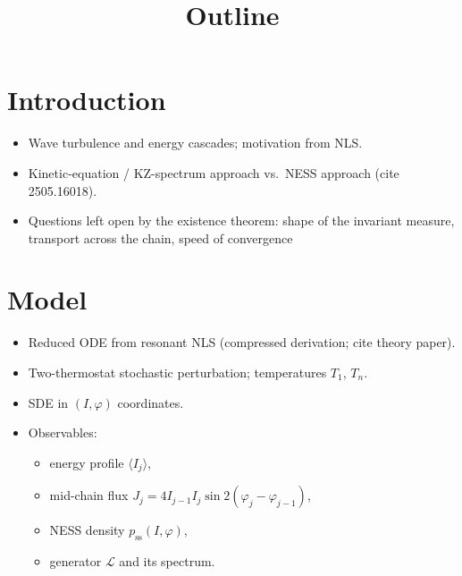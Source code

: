\documentclass[11pt]{article}
\title{Outline}
\author{}
\date{}
\begin{document}
\maketitle


\section{Introduction}
\begin{itemize}
  \item Wave turbulence and energy cascades; motivation from NLS.
  \item Kinetic-equation / KZ-spectrum approach vs.\ NESS approach
        (cite 2505.16018).
  \item Questions left open by the existence theorem: shape of the
        invariant measure, transport across the chain, speed of
        convergence
\end{itemize}

\section{Model}
\begin{itemize}
  \item Reduced ODE from resonant NLS (compressed derivation; cite
        theory paper).
  \item Two-thermostat stochastic perturbation; temperatures $T_1$, $T_n$.
  \item SDE in $(I, \varphi)$ coordinates.
  \item Observables:
    \begin{itemize}
      \item energy profile $\langle I_j \rangle$,
      \item mid-chain flux $J_j = 4 I_{j-1} I_j \sin 2(\varphi_j -
            \varphi_{j-1})$,
      \item NESS density $p_{\text{ss}}(I, \varphi)$,
      \item generator $\mathcal{L}$ and its spectrum.
    \end{itemize}
\end{itemize}
\end{document}
